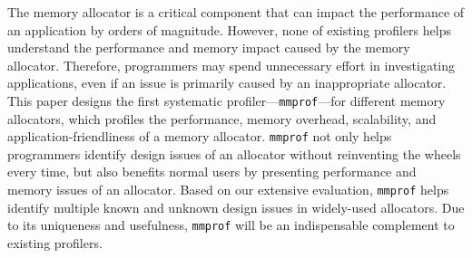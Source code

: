 The memory allocator is a critical component that can impact the performance of an application by orders of magnitude. However, none of existing profilers helps understand the performance and memory impact caused by the memory allocator. Therefore, programmers may spend unnecessary effort in investigating applications, even if an issue is primarily caused by an inappropriate allocator. This paper designs the first systematic profiler---\texttt{mmprof}---for different memory allocators, which profiles the performance, memory overhead, scalability, and application-friendliness of a memory allocator. \texttt{mmprof} not only helps programmers identify design issues of an allocator without reinventing the wheels every time, but also benefits normal users by presenting performance and memory issues of an allocator. Based on our extensive evaluation, \texttt{mmprof} helps identify multiple known and unknown design issues in widely-used allocators. 
Due to its uniqueness and usefulness, \texttt{mmprof} will be an indispensable complement to existing profilers. 


 